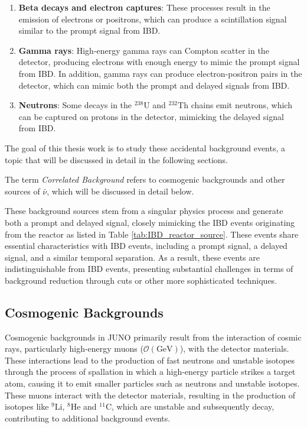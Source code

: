 \begin{enumerate}
	\item \textbf{Beta decays and electron captures}: These processes result in the emission of electrons or positrons, which can produce a scintillation signal similar to the prompt signal from IBD.

	\item \textbf{Gamma rays}: High-energy gamma rays can Compton scatter in the detector, producing electrons with enough energy to mimic the prompt signal from IBD. In addition, gamma rays can produce electron-positron pairs in the detector, which can mimic both the prompt and delayed signals from IBD.
	
	\item \textbf{Neutrons}: Some decays in the $^{238}\mathrm{U}$ and $^{232}\mathrm{Th}$ chains emit neutrons, which can be captured on protons in the detector, mimicking the delayed signal from IBD.

\end{enumerate}

The goal of this thesis work is to study these accidental background events, a topic that will be discussed in detail in the following sections.



The term \textit{Correlated Background} refers to cosmogenic backgrounds and other sources of $\bar{\nu}$, which will be discussed in detail below.

These background sources stem from a singular physics process and generate both a prompt and delayed signal, closely mimicking the IBD events originating from the reactor as listed in Table \ref{tab:IBD_reactor_source}. These events share essential characteristics with IBD events, including a prompt signal, a delayed signal, and a similar temporal separation. As a result, these events are indistinguishable from IBD events, presenting substantial challenges in terms of background reduction through cuts or other more sophisticated techniques.

\subsection*{Cosmogenic Backgrounds}

Cosmogenic backgrounds in JUNO primarily result from the interaction of cosmic rays, particularly high-energy muons ($\mathcal{O}(\text{GeV})$), with the detector materials. These interactions lead to the production of fast neutrons and unstable isotopes through the process of spallation in which a high-energy particle strikes a target atom, causing it to emit smaller particles such as neutrons and unstable isotopes. These muons interact with the detector materials, resulting in the production of isotopes like  $^{9}\mathrm{Li}$, $^{8}\mathrm{He}$ and $^{11}\mathrm{C}$, which are unstable and subsequently decay, contributing to additional background events.

